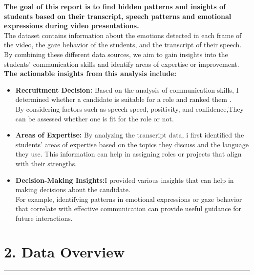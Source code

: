 \documentclass{article}
\begin{document}
\begin{tcolorbox}[colback=blue!5!white, colframe=green!70!black,title=Introduction]
\textbf{The goal of this report is to find hidden patterns and insights of students based on their transcript, speech patterns and emotional expressions during video presentations.}\\
\vspace{0.2in}
The dataset contains information about the emotions detected in each frame of the video, the gaze behavior of the students, and the transcript of their speech. By combining these different data sources, we aim to gain insights into the students' communication skills and identify areas of expertise or improvement.\\

\vspace{0.3in}
\textbf{The actionable insights from this analysis include:}

\begin{itemize}
    \item \textbf{Recruitment Decision:} Based on the analysis of communication skills, I determined whether a candidate is suitable for a role and ranked them .\\
     By considering factors such as speech speed, positivity, and confidence,They can be assessed whether one is fit for the role or not.
    
    \item \textbf{Areas of Expertise:} By analyzing the transcript data, i first identified the students' areas of expertise based on the topics they discuss and the language they use. This information can help in assigning roles or projects that align with their strengths.
    
    \item \textbf{Decision-Making Insights:}I provided various insights that can help in making decisions about the candidate.\\
     For example, identifying patterns in emotional expressions or gaze behavior that correlate with effective communication can provide useful guidance for future interactions.
\end{itemize}
\end{tcolorbox}


\newpage
\section{2. Data Overview}
  \begin{center}
        \color{red}\rule{1\linewidth}{1mm}
    \end{center}
\end{document}
